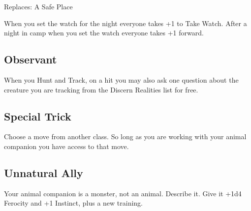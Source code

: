 Replaces: A Safe Place

         

When you set the watch for the night everyone takes +1 to Take Watch. After a night in camp when you set the watch everyone takes +1 forward.

         
\subsection{Observant}   
         

When you Hunt and Track, on a hit you may also ask one question about the creature you are tracking from the Discern Realities list for free.

         
\subsection{Special Trick}    
         

Choose a move from another class. So long as you are working with your animal companion you have access to that move.

         
\subsection{Unnatural Ally}    
         

Your animal companion is a monster, not an animal. Describe it. Give it +1d4 Ferocity and +1 Instinct, plus a new training.

       

                
